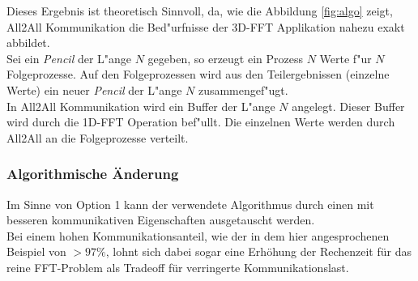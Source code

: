 Dieses Ergebnis ist theoretisch Sinnvoll, da, wie die Abbildung \ref{fig:algo} zeigt, All2All Kommunikation die Bed"urfnisse der 3D-FFT Applikation nahezu exakt abbildet.\\
Sei ein \textit{Pencil} der L"ange $N$ gegeben, so erzeugt ein Prozess $N$ Werte f"ur $N$ Folgeprozesse. Auf den Folgeprozessen wird aus den Teilergebnissen (einzelne Werte) ein neuer \textit{Pencil} der L"ange $N$ zusammengef"ugt.\\
In All2All Kommunikation wird ein Buffer der L"ange $N$ angelegt. Dieser Buffer wird durch die 1D-FFT Operation bef"ullt. Die einzelnen Werte werden durch All2All an die Folgeprozesse verteilt.

\subsubsection{Algorithmische Änderung}
Im Sinne von Option 1 kann der verwendete Algorithmus durch einen mit besseren kommunikativen Eigenschaften ausgetauscht werden.\\
Bei einem hohen Kommunikationsanteil, wie der in dem hier angesprochenen Beispiel von $>97\%$, lohnt sich dabei sogar eine Erhöhung der Rechenzeit für das reine FFT-Problem als Tradeoff für verringerte Kommunikationslast.\\
\\

